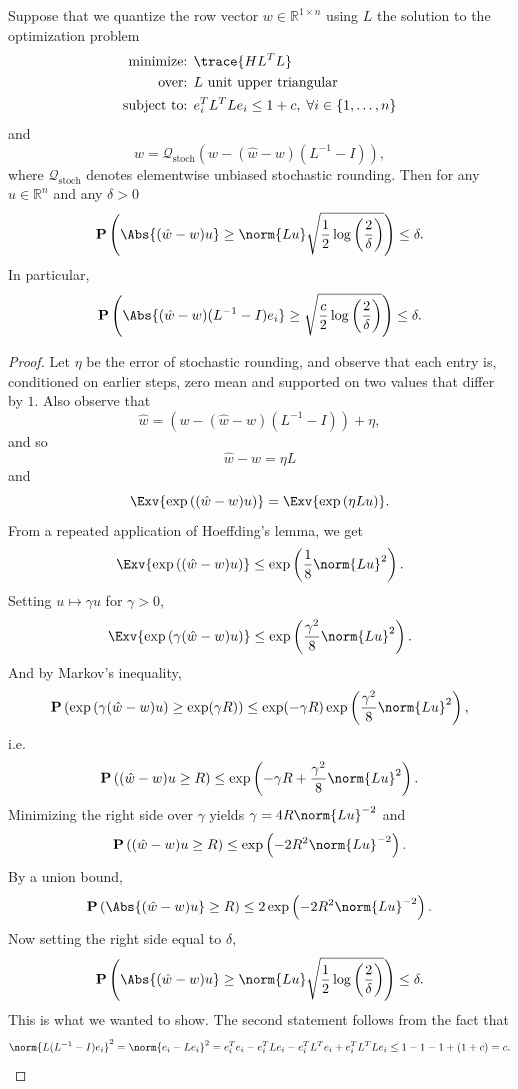 \begin{toappendix}
\begin{lemma}
Suppose that we quantize the row vector $w \in \mathbb{R}^{1 \times n}$ using $L$ the solution to the optimization problem
\begin{align*}
    \mbox{minimize: } & \trace{H L^T L} \\
    \mbox{over: } & L \text{ unit upper triangular} \\
    \mbox{subject to: } & e_i^T L^T L e_i \le 1 + c, \; \forall i \in \{1,\ldots,n\}
\end{align*}
and
\[
	\hat w = \mathcal{Q}_{\operatorname{stoch}}\left( w - (\hat w - w) (L^{-1} - I) \right),
\]
where $\mathcal{Q}_{\operatorname{stoch}}$ denotes elementwise unbiased stochastic rounding. Then for any $u \in \mathbb{R}^n$ and any $\delta > 0$
\[
	\mathbf{P}\left( \Abs{ (\hat w - w) u } \ge \norm{L u} \sqrt{\frac{1}{2} \log\left( \frac{2}{\delta} \right) } \right) \le \delta.
\]
In particular,
\[
	\mathbf{P}\left( \Abs{ (\hat w - w) (L^{-1} - I) e_i } \ge \sqrt{\frac{c}{2} \log\left( \frac{2}{\delta} \right) } \right) \le \delta.
\]
\end{lemma}
\begin{proof}
Let $\eta$ be the error of stochastic rounding, and observe that each entry is, conditioned on earlier steps, zero mean and supported on two values that differ by $1$.
Also observe that
\[
	\hat w = \left( w - (\hat w - w) (L^{-1} - I) \right) + \eta,
\]
and so
\[
	\hat w - w = \eta L
\]
and
\[
	\Exv{\exp\left( (\hat w - w) u \right)} = \Exv{\exp\left( \eta L u \right)}.
\]
From a repeated application of Hoeffding's lemma, we get
\[
	\Exv{\exp\left( (\hat w - w) u \right)} \le \exp\left( \frac{1}{8} \norm{ L u }^2 \right).
\]
Setting $u \mapsto \gamma u$ for $\gamma > 0$,
\[
	\Exv{\exp\left( \gamma (\hat w - w) u \right)} \le \exp\left( \frac{\gamma^2}{8} \norm{ L u }^2 \right).
\]
And by Markov's inequality,
\[
	\mathbf{P}\left( \exp\left( \gamma (\hat w - w) u \right) \ge \exp(\gamma R) \right) \le \exp(-\gamma R) \exp\left( \frac{\gamma^2}{8} \norm{ L u }^2 \right),
\]
i.e.
\[
	\mathbf{P}\left( (\hat w - w) u \ge R \right) \le \exp\left( -\gamma R + \frac{\gamma^2}{8} \norm{ L u }^2 \right).
\]
Minimizing the right side over $\gamma$ yields $\gamma = 4 R \norm{L u}^{-2}$ and
\[
	\mathbf{P}\left( (\hat w - w) u \ge R \right) \le \exp\left( -2 R^2 \norm{L u}^{-2} \right).
\]
By a union bound,
\[
	\mathbf{P}\left( \Abs{ (\hat w - w) u } \ge R \right) \le 2 \exp\left( -2 R^2 \norm{L u}^{-2} \right).
\]
Now setting the right side equal to $\delta$,
\[
	\mathbf{P}\left( \Abs{ (\hat w - w) u } \ge \norm{L u} \sqrt{\frac{1}{2} \log\left( \frac{2}{\delta} \right) } \right) \le \delta.
\]
This is what we wanted to show. The second statement follows from the fact that
\[
	 \norm{L (L^{-1} - I) e_i}^2
	 =
	 \norm{e_i - L e_i}^2
	 =
	e_i^T e_i - e_i^T L e_i - e_i^T L^T e_i + e_i^T L^T L e_i
	\le
	1 - 1 - 1 + (1 + c)
	=
	c.
\]
\end{proof}


\end{toappendix}
